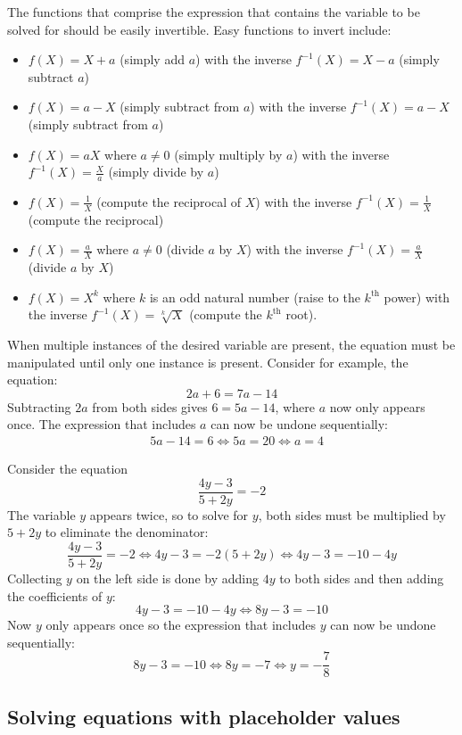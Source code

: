 \documentclass{article}
\begin{document}
The functions that comprise the expression that contains the variable to be solved for should be easily invertible. Easy functions to invert include:
\begin{itemize}
\item \(f(X) = X + a\) (simply add \(a\)) with the inverse \(f^{-1}(X) = X - a\) (simply subtract \(a\))
\item \(f(X) = a - X\) (simply subtract from \(a\)) with the inverse \(f^{-1}(X) = a - X\) (simply subtract from \(a\))
\item \(f(X) = aX\) where \(a \neq 0\) (simply multiply by \(a\)) with the inverse \(f^{-1}(X) = \frac{X}{a}\) (simply divide by \(a\))
\item \(f(X) = \frac{1}{X}\) (compute the reciprocal of \(X\)) with the inverse \(f^{-1}(X) = \frac{1}{X}\) (compute the reciprocal)
\item \(f(X) = \frac{a}{X}\) where \(a \neq 0\) (divide \(a\) by \(X\)) with the inverse \(f^{-1}(X) = \frac{a}{X}\) (divide \(a\) by \(X\))
\item \(f(X) = X^k\) where \(k\) is an odd natural number (raise to the \(k^\text{th}\) power) with the inverse \(f^{-1}(X) = \sqrt[k]{X}\) (compute the \(k^\text{th}\) root).
\end{itemize} 

When multiple instances of the desired variable are present, the equation must be manipulated until only one instance is present. Consider for example, the equation:
\[2a + 6 = 7a - 14\]
Subtracting \(2a\) from both sides gives \(6 = 5a - 14\), where \(a\) now only appears once. The expression that includes \(a\) can now be undone sequentially:
\begin{align*}
& 5a - 14 = 6
\iff 5a = 20 
\iff a = 4
\end{align*}

Consider the equation
\[\frac{4y - 3}{5 + 2y} = -2\]
The variable \(y\) appears twice, so to solve for \(y\), both sides must be multiplied by \(5 + 2y\) to eliminate the denominator:
\[\frac{4y - 3}{5 + 2y} = -2 \iff 4y - 3 = -2(5 + 2y) \iff 4y - 3 = -10 - 4y\]
Collecting \(y\) on the left side is done by adding \(4y\) to both sides and then adding the coefficients of \(y\):
\[4y - 3 = -10 - 4y \iff 8y - 3 = -10\]
Now \(y\) only appears once so the expression that includes \(y\) can now be undone sequentially:
\[8y - 3 = -10 \iff 8y = -7 \iff y = -\frac{7}{8}\]



\subsection{Solving equations with placeholder values}
\end{document}
